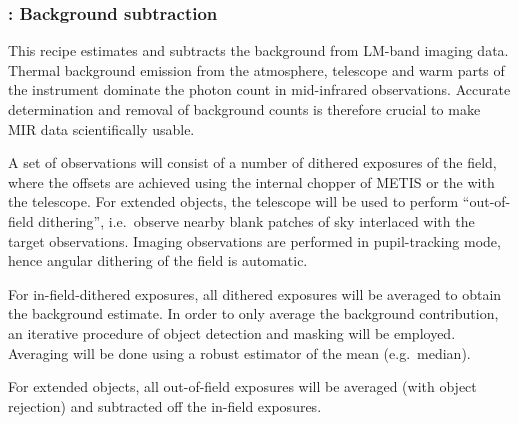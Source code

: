 \clearpage
\subsubsection{: Background subtraction}
\label{lm_img_background}
\label{rec:lm_img_background}
\label{sssec:lm_img_background}
\label{metis_lm_img_background}
\label{rec:metis_lm_img_background}
\label{sssec:metis_lm_img_background}

This recipe estimates and subtracts the background from LM-band
imaging data. Thermal background emission from the atmosphere,
telescope and warm parts of the instrument dominate the photon count
in mid-infrared observations. Accurate determination and removal of
background counts is therefore crucial to make MIR data scientifically
usable.

A set of observations will consist of a number of dithered exposures
of the field, where the offsets are achieved using the internal
chopper of METIS or the with the telescope. For extended objects, the
telescope will be used to perform ``out-of-field dithering'', i.e.\
observe nearby blank patches of sky interlaced with the target
observations. Imaging observations are performed in pupil-tracking
mode, hence angular dithering of the field is automatic.

For in-field-dithered exposures, all dithered exposures will be
averaged to obtain the background estimate. In order to only average
the background contribution, an iterative procedure of object
detection and masking will be employed. Averaging will be done using a
robust estimator of the mean (e.g.\ median).

For extended objects, all out-of-field exposures will be averaged
(with object rejection) and subtracted off the in-field exposures.

%

